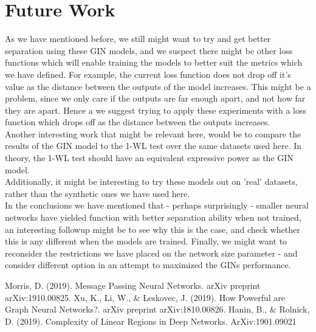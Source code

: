 \documentclass{article}
\begin{document}
\part*{Future Work}
As we have mentioned before, we still might want to try and get better separation using these GIN models,
and we suspect there might be other loss functions which will enable training the models to better suit
the metrics which we have defined. For example, the current loss function does not drop off it's value
as the distance between the outputs of the model increases. This might be a problem, since we
only care if the outputs are far enough apart, and not how far they are apart. Hence a we suggest trying to
apply these experiments with a loss function which drops off as the distance between the outputs increases.\\
Another interesting work that might be relevant here, would be to compare the results of the GIN model to
the 1-WL test over the same datasets used here. In theory, the 1-WL test should have an equivalent expressive power as
the GIN model.\\
Additionally, it might be interesting to try these models out on 'real' datasets,
rather than the synthetic ones we have used here. \\
In the conclusions we have mentioned that - perhaps surprisingly - smaller neural networks have yielded function with better separation ability when not trained,
an interesting followup might be to see why this is the case, and check whether this is any different when the models are trained.
Finally, we might want to reconsider the restrictions we have placed on the network size parameter - and consider different option
in an attempt to maximized the GINs performance.

\begin{thebibliography}{9}
    Morris, D. (2019). Message Passing Neural Networks. arXiv preprint arXiv:1910.00825.
    Xu, K., Li, W., \& Leskovec, J. (2019). How Powerful are Graph Neural Networks?. arXiv preprint arXiv:1810.00826.
    Hanin, B., \& Rolnick, D. (2019). Complexity of Linear Regions in Deep Networks. ArXiv:1901.09021
\end{thebibliography}
\end{document}
